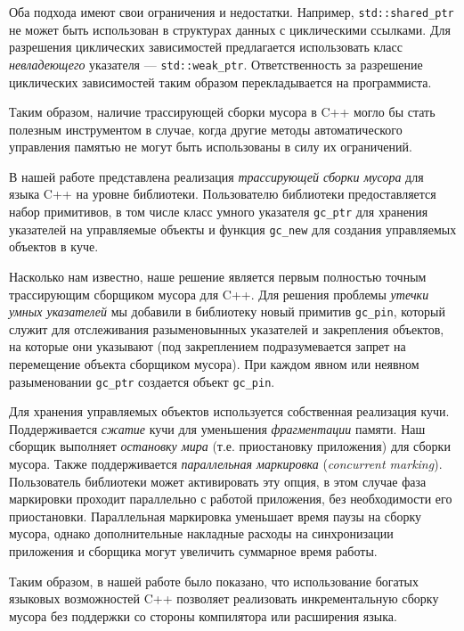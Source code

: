 \documentclass[10pt]{article}
\newcommand{\code}{\texttt}
\begin{document}
Оба подхода имеют свои ограничения и недостатки. 
Например, \code{std::shared\_ptr} не может быть использован 
в структурах данных с циклическими ссылками.
Для разрешения циклических зависимостей предлагается использовать  
класс \emph{невладеющего} указателя --- \code{std::weak\_ptr}.
Ответственность за разрешение циклических зависимостей 
таким образом перекладывается на программиста. 

Таким образом, наличие трассирующей сборки мусора в C++
могло бы стать полезным инструментом в случае, 
когда другие методы автоматического управления памятью 
не могут быть использованы в силу их ограничений.

В нашей работе представлена реализация \emph{трассирующей сборки мусора} 
для языка C++ на уровне библиотеки. 
Пользователю библиотеки предоставляется набор примитивов, 
в том числе класс умного указателя \code{gc\_ptr} для хранения
указателей на управляемые объекты и 
функция \code{gc\_new} для создания управляемых объектов в куче.

Насколько нам известно, наше решение является первым
полностью точным трассирующим сборщиком мусора для C++.
Для решения проблемы \emph{утечки умных указателей}
мы добавили в библиотеку новый примитив \code{gc\_pin},
который служит для отслеживания разыменовынных указателей
и закрепления объектов, на которые они указывают 
(под закреплением подразумевается запрет на перемещение объекта 
сборщиком мусора). При каждом явном или неявном разыменовании \code{gc\_ptr}
создается объект \code{gc\_pin}. 

Для хранения управляемых объектов используется собственная реализация кучи.
Поддерживается \emph{сжатие} кучи для уменьшения \emph{фрагментации} памяти.
Наш сборщик выполняет \emph{остановку мира} (т.е. приостановку приложения)
для сборки мусора. 
Также поддерживается \emph{параллельная маркировка} (\emph{concurrent marking}).
Пользователь библиотеки может активировать эту опция,
в этом случае фаза маркировки проходит параллельно с работой приложения, 
без необходимости его приостановки. 
Параллельная маркировка уменьшает время паузы на сборку мусора, 
однако дополнительные накладные расходы на синхронизации приложения и сборщика
могут увеличить суммарное время работы.

Таким образом, в нашей работе было показано, 
что использование богатых языковых возможностей C++ 
позволяет реализовать инкрементальную сборку мусора 
без поддержки со стороны компилятора или расширения языка.

\end{document}
